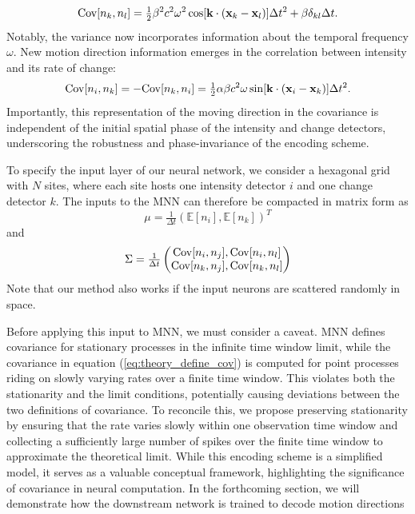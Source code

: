 \begin{equation}
    {\rm Cov}[n_k, n_l] = \tfrac{1}{2} \beta^2 c^2 \omega^2
\cos[\mathbf{k} \cdot (\mathbf{x}_k - \mathbf{x}_l)] \Delta t^2 + \beta\delta_{kl} \Delta t .
\end{equation}
Notably, the variance now incorporates information about the temporal frequency $\omega$.
New motion direction information emerges in the correlation between intensity and its rate of change:
\begin{equation}
    {\rm Cov}[n_i, n_k] 
    = -{\rm Cov}[n_k, n_i]
    = \tfrac{1}{2} \alpha \beta c^2 \omega\sin[\mathbf{k} \cdot (\mathbf{x}_i - \mathbf{x}_k)]\Delta t^2.
    \label{eq:motion_information_embed}
\end{equation}
Importantly, this representation of the moving direction in the covariance is independent of the initial spatial phase of the intensity and change detectors, underscoring the robustness and phase-invariance of the encoding scheme.

To specify the input layer of our neural network, we consider a hexagonal grid with \(N\) sites, where each site hosts one intensity detector \(i\) and one change detector \(k\).
The inputs to the MNN can therefore be compacted in matrix form as 
\begin{equation}
    \mu = \tfrac{1}{\Delta t}(\mathbb{E}[n_i], \mathbb{E}[n_k])^T
    \label{eq:vo_input_mean}
\end{equation}
and
\begin{equation}
\Sigma = \tfrac{1}{\Delta t} \begin{pmatrix}
{\rm Cov}[n_i, n_j], {\rm Cov}[n_i, n_l] \\
{\rm Cov}[n_k, n_j], {\rm Cov}[n_k, n_l]
\end{pmatrix} \label{eq:vo_input_cov}
\end{equation}
Note that our method also works if the input neurons are scattered randomly in space.

Before applying this input to MNN, we must consider a caveat.
MNN defines covariance for stationary processes in the infinite time window limit, while the covariance in equation (\ref{eq:theory_define_cov}) is computed for point processes riding on slowly varying rates over a finite time window.
This violates both the stationarity and the limit conditions, potentially causing deviations between the two definitions of covariance.
To reconcile this, we propose preserving stationarity by ensuring that the rate varies slowly within one observation time window and collecting a sufficiently large number of spikes over the finite time window to approximate the theoretical limit.
While this encoding scheme is a simplified model, it serves as a valuable conceptual framework, highlighting the significance of covariance in neural computation. 
In the forthcoming section, we will demonstrate how the downstream network is trained to decode motion directions